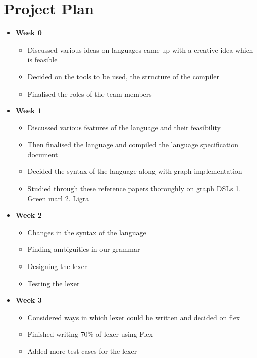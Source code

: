 \documentclass[english,a4paper,12pt]{report}
\begin{document}
\chapter{Project Plan}
\vspace{-0.5cm}
\begin{itemize}
    \item \textbf{Week 0} \begin{itemize}
        \item Discussed various ideas on languages came up with a
        creative idea which is  feasible
        \item Decided on the tools to be used, the structure of the compiler
        \item Finalised the roles of the team members
    \end{itemize}
    \item \textbf{Week 1 }\begin{itemize}
        \item Discussed various features of the language and their feasibility
        \item Then finalised the language and compiled the language specification
        document
        \item Decided the syntax of the language along with graph implementation 
        \item Studied through these reference papers thoroughly on graph DSLs
        1. Green marl 2. Ligra
        
    \end{itemize}

        \item\textbf{ Week 2 }\begin{itemize}
        \item  Changes in the syntax of the language
        \item Finding ambiguities in our grammar
        \item Designing the lexer
        \item Testing the lexer
    \end{itemize}

        \item\textbf{ Week 3}\begin{itemize}
        \item Considered ways in which lexer could be  written and decided on flex
        \item Finished writing 70\% of lexer using Flex
        \item Added more test cases for the lexer
    \end{itemize}


\end{itemize}
\end{document}
